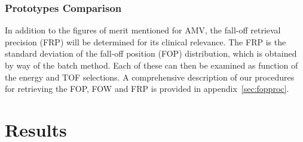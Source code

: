 \documentclass[a4paper,english,12pt]{article}
\begin{document}





\subsubsection{Prototypes Comparison}

In addition to the figures of merit mentioned for AMV, the fall-off retrieval precision (FRP) will be determined for its clinical relevance. The FRP is the standard deviation of the fall-off position (FOP) distribution, which is obtained by way of the batch method. Each of these can then be examined as function of the energy and TOF selections. A comprehensive description of our procedures for retrieving the FOP, FOW and FRP is provided in appendix~\ref{sec:fopproc}.

\section{Results}
\end{document}
